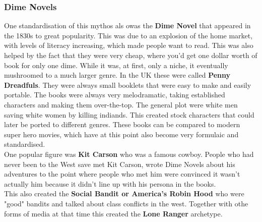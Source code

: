 \documentclass{article}
\begin{document}
	\subsubsection{Dime Novels}
	One standardisation of this mythos als owas the \textbf{Dime Novel} that appeared in the 1830s to great popularity. This was due to an explosion of the home market, with levels of literacy increasing, which made people want to read. This was also helped by the fact that they were very cheap, where you'd get one dollar worth of book for only one dime. While it was, at first, only a niche, it eventually mushroomed to a much larger genre. In the UK these were called \textbf{Penny Dreadfuls}. They were always small booklets that were easy to make and easily portable. The books were always very melodramatic, taking established characters and making them over-the-top. The general plot were white men saving white women by killing indiands. This created stock characters that could later be ported to different genres. These books can be compared to modern super hero movies, which have at this point also become very formulaic and standardised. \\
	One popular figure was \textbf{Kit Carson} who was a famous  cowboy. People who had never been to the West save met Kit Carson, wrote Dime Novels about his adventures to the point where people who met him were convinced it wasn't actually him because it didn't line up with his persona in the books. \\
	This also created the \textbf{Social Bandit or America's Robin Hood} who were "good" bandits and talked about class conflicts in the west. Together with othe forms of media at that time this created the \textbf{Lone Ranger} archetype. \\
\end{document}
